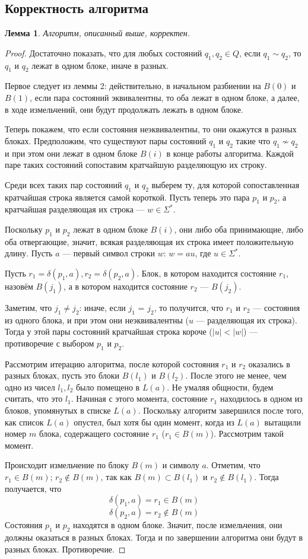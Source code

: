 \documentclass{article}
\newtheorem{lemma}{Лемма}
\begin{document}
\subsection{Корректность алгоритма}
\begin{lemma}
  Алгоритм, описанный выше, корректен.
\end{lemma}
\begin{proof}
  Достаточно показать, что для любых состояний $q_1, q_2 \in Q$, если $q_1 \sim q_2$, то $q_1$ и $q_2$ лежат в одном блоке, иначе в разных.

  Первое следует из леммы 2: действительно, в начальном разбиении на $B(0)$ и $B(1)$, если пара состояний эквивалентны, то оба лежат в одном блоке, а далее, в ходе измельчений, они будут продолжать лежать в одном блоке.

  Теперь покажем, что если состояния неэквивалентны, то они окажутся в разных блоках. Предположим, что существуют пары состояний $q_1$ и $q_2$ такие что $q_1 \not \sim q_2$ и при этом они лежат в одном блоке $B(i)$ в конце работы алгоритма. Каждой паре таких состояний сопоставим кратчайшую разделяющую их строку.

  Среди всех таких пар состояний $q_1$ и $q_2$ выберем ту, для которой сопоставленная кратчайшая строка является самой короткой. Пусть теперь это пара $p_1$ и $p_2$, а кратчайшая разделяющая их строка --- $w \in \Sigma^*$.

  Поскольку $p_1$ и $p_2$ лежат в одном блоке $B(i)$, они либо оба принимающие, либо оба отвергающие, значит, всякая разделяющая их строка имеет положительную длину. Пусть $a$ --- первый символ строки $w$: $w = au$, где $u \in \Sigma^*$.

  Пусть $r_1 = \delta(p_1, a), r_2 = \delta(p_2, a)$. Блок, в котором находится состояние $r_1$, назовём $B(j_1)$, а в котором находится состояние $r_2$ --- $B(j_2)$.

  Заметим, что $j_1 \neq j_2$: иначе, если $j_1$ = $j_2$, то получится, что $r_1$ и $r_2$ --- состояния из одного блока, и при этом они неэквивалентны ($u$ --- разделяющая их строка). Тогда у этой пары состояний кратчайшая строка короче ($|u| < |w|$) --- противоречие с выбором $p_1$ и $p_2$.

  Рассмотрим итерацию алгоритма, после которой состояния $r_1$ и $r_2$ оказались в разных блоках, пусть это блоки $B(l_1)$ и $B(l_2)$. После этого не менее, чем одно из чисел $l_1, l_2$ было помещено в $L(a)$. Не умаляя общности, будем считать, что это $l_1$. Начиная с этого момента, состояние $r_1$ находилось в одном из блоков, упомянутых в списке $L(a)$. Поскольку алгоритм завершился после того, как список $L(a)$ опустел, был хотя бы один момент, когда из $L(a)$ вытащили номер $m$ блока, содержащего состояние $r_1$ ($r_1 \in B(m)$). Рассмотрим такой момент.

  Происходит измельчение по блоку $B(m)$ и символу $a$. Отметим, что $r_1 \in B(m)$; $r_2 \notin B(m)$, так как $B(m) \subset B(l_1)$ и $r_2 \notin B(l_1)$. Тогда получается, что
  \[\delta(p_1, a) = r_1 \in B(m)\]
  \[\delta(p_2, a) = r_2 \notin B(m)\]
  Состояния $p_1$ и $p_2$ находятся в одном блоке. Значит, после измельчения, они должны оказаться в разных блоках. Тогда и по завершении алгоритма они будут в разных блоках. Противоречие.
\end{proof}
\end{document}
